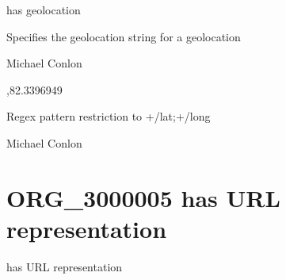 \documentclass[letterpaper,10pt,english]{sphinxmanual}
\begin{document}
\begin{sphinxShadowBox}

\sphinxAtStartPar
has geolocation
\end{sphinxShadowBox}

\begin{sphinxShadowBox}

\sphinxAtStartPar
Specifies the geolocation string for a geolocation
\end{sphinxShadowBox}

\begin{sphinxShadowBox}

\sphinxAtStartPar
Michael Conlon 
\end{sphinxShadowBox}

\begin{sphinxShadowBox}

,\sphinxhyphen{}82.3396949
\end{sphinxShadowBox}

\begin{sphinxShadowBox}

\sphinxAtStartPar
Regex pattern restriction to +/\sphinxhyphen{}lat;+/\sphinxhyphen{}long
\end{sphinxShadowBox}

\begin{sphinxShadowBox}

\sphinxAtStartPar
Michael Conlon 
\end{sphinxShadowBox}
\begin{quote}

\ignorespaces \end{quote}


\section{ORG\_3000005 \sphinxhyphen{} has URL representation}
\label{\detokenize{doc-ORG_3000005:org-3000005-has-url-representation}}\label{\detokenize{doc-ORG_3000005:index-0}}\label{\detokenize{doc-ORG_3000005::doc}}
\begin{sphinxShadowBox}

\sphinxAtStartPar
has URL representation
\end{sphinxShadowBox}
\end{document}
